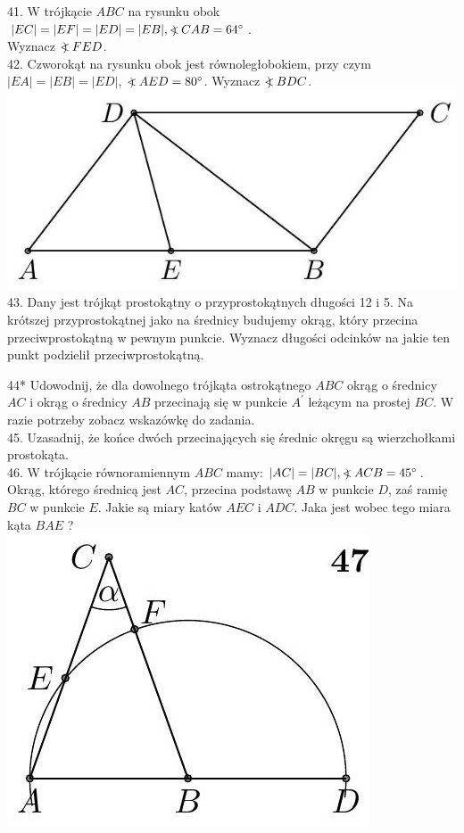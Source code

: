 \documentclass[10pt]{article}
\newcommand\Varangle{\mathop{{<\!\!\!\!\!\text{\small)}}\:}\nolimits}
\begin{document}
41. W trójkącie \(A B C\) na rysunku obok\\
\(|E C|=|E F|=|E D|=|E B|, \Varangle C A B=64^{\circ}\).\\
Wyznacz \(\Varangle F E D\).\\
42. Czworokąt na rysunku obok jest równoległobokiem, przy czym \(|E A|=|E B|=|E D|\), \(\Varangle A E D=80^{\circ}\). Wyznacz \(\Varangle B D C\).\\
\includegraphics[max width=\textwidth, center]{2024_11_21_71f62bd117d375398909g-190(1)}\\
43. Dany jest trójkąt prostokątny o przyprostokątnych długości 12 i 5. Na krótszej przyprostokątnej jako na średnicy budujemy okrąg, który przecina przeciwprostokątną w pewnym punkcie. Wyznacz długości odcinków na jakie ten punkt podzielił przeciwprostokątną.

44* Udowodnij, że dla dowolnego trójkąta ostrokątnego \(A B C\) okrąg o średnicy \(A C\) i okrąg o średnicy \(A B\) przecinają się w punkcie \(A^{\prime}\) leżącym na prostej \(B C\). W razie potrzeby zobacz wskazówkę do zadania.\\
45. Uzasadnij, że końce dwóch przecinających się średnic okręgu są wierzchołkami prostokąta.\\
46. W trójkącie równoramiennym \(A B C\) mamy: \(|A C|=|B C|, \Varangle A C B=45^{\circ}\). Okrąg, którego średnicą jest \(A C\), przecina podstawę \(A B\) w punkcie \(D\), zaś ramię \(B C\) w punkcie \(E\). Jakie są miary katów \(A E C\) i \(A D C\). Jaka jest wobec tego miara kąta \(B A E\) ?\\
\includegraphics[max width=\textwidth, center]{2024_11_21_71f62bd117d375398909g-190}
\end{document}
